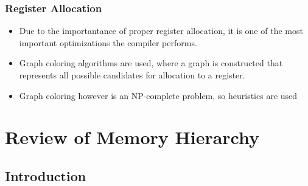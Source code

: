 \documentclass[11pt, a4paper]{article}
\theoremstyle{definition}
\theoremstyle{remark}
\newcommand{\app}[2]{%
  \renewcommand{\thesection}{\Alph{section}}%
  \renewcommand{\theHsection}{app.\Alph{section}}%
  \setcounter{section}{#1}\addtocounter{section}{-1}%
  \section{#2}}
\begin{document}
\subsubsection{Register Allocation}
\begin{itemize}
  \item Due to the importantance of proper register allocation, it is one of the most important optimizations the compiler performs.
  \item Graph coloring algorithms are used, where a graph is constructed that represents all possible candidates for allocation to a register.
  \item Graph coloring however is an NP-complete problem, so heuristics are used
\end{itemize}
\app{2}{Review of Memory Hierarchy}
\subsection{Introduction}
\end{document}

